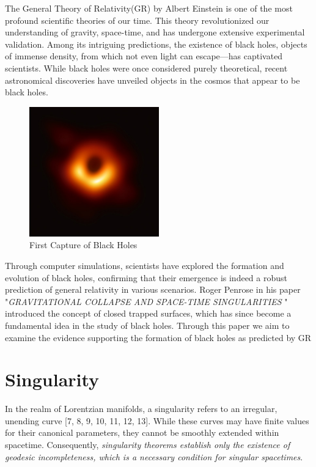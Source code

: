 \documentclass{article}
\begin{document}
\large 
The General Theory of Relativity(GR) by Albert Einstein is one of the most profound scientific theories of our time. This theory revolutionized our understanding of gravity, space-time, and has undergone extensive experimental validation. Among its intriguing predictions, the existence of black holes, objects of immense density, from which not even light can escape—has captivated scientists. While black holes were once considered purely theoretical, recent astronomical discoveries have unveiled objects in the cosmos that appear to be black holes.

\begin{figure}
    \centering
    \includegraphics[width=0.5\textwidth]{BH-1.jpg}
    \caption{First Capture of Black Holes}
    \label{fig:1}
\end{figure}



Through computer simulations, scientists have explored the formation and evolution of black holes, confirming that their emergence is indeed a robust prediction of general relativity in various scenarios. Roger Penrose in his paper  "\textit{GRAVITATIONAL COLLAPSE AND SPACE-TIME SINGULARITIES }" introduced the concept of closed trapped surfaces, which has since become a fundamental idea in the study of black holes.
Through this paper we aim to examine the evidence supporting the formation of black holes as predicted by GR

\section{\Large Singularity}

\large 
In the realm of Lorentzian manifolds, a singularity refers to an irregular, unending curve [7, 8, 9, 10, 11, 12, 13]. While these curves may have finite values for their canonical parameters, they cannot be smoothly extended within spacetime. Consequently, \textit{singularity theorems establish only the existence of geodesic incompleteness, which is a necessary condition for singular spacetimes}. 
\end{document}
